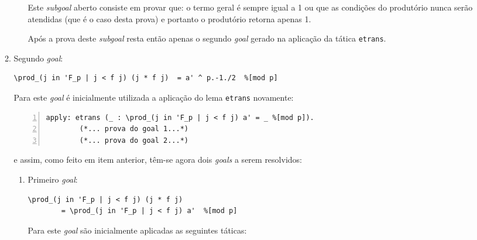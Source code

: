 \begin{enumerate}[label=\textbf{\roman*.}]
\begin{enumerate}[label=\textbf{(\alph*)}]
\begin{enumerate}[listparindent=\parindent]
                        Este \textit{subgoal} aberto consiste em provar que: o termo geral é sempre igual a 1 ou que as condições do produtório nunca serão atendidas (que é o caso desta prova) e portanto o produtório retorna apenas 1. 
                        
                        Após a prova deste \textit{subgoal} resta então apenas o segundo \textit{goal} gerado na aplicação da tática \lstinline[language=coq]|etrans|.
                
                \end{enumerate}

                \item Segundo \textit{goal}:
        
                        \begin{lstlisting}[language=coq,frame=single,tabsize=1]
\prod_(j in 'F_p | j < f j) (j * f j)  = a' ^ p.-1./2  %[mod p]
                        \end{lstlisting}

                Para este \textit{goal} é inicialmente utilizada a aplicação do lema \lstinline[language=coq]|etrans| novamente:

                        \begin{lstlisting}[language=coq,frame=single, numbers=left,stepnumber=1,tabsize=1, escapechar=\$]
apply: etrans (_ : \prod_(j in 'F_p | j < f j) a' = _ %[mod p]).
        (*... prova do goal 1...*)
        (*... prova do goal 2...*)
                        \end{lstlisting}

                e assim, como feito em item anterior, têm-se agora dois \textit{goals} a serem resolvidos:
                
                \begin{enumerate}[label=\textbf{(\alph{enumii}.\arabic*)}]
                        
                        \item Primeiro \textit{goal}:
                
                        \begin{lstlisting}[language=coq,frame=single,tabsize=1]
\prod_(j in 'F_p | j < f j) (j * f j)  
        = \prod_(j in 'F_p | j < f j) a'  %[mod p]
                        \end{lstlisting}

                        Para este \textit{goal} são inicialmente aplicadas as seguintes táticas:
                

\end{enumerate}
\end{enumerate}
\end{enumerate}

